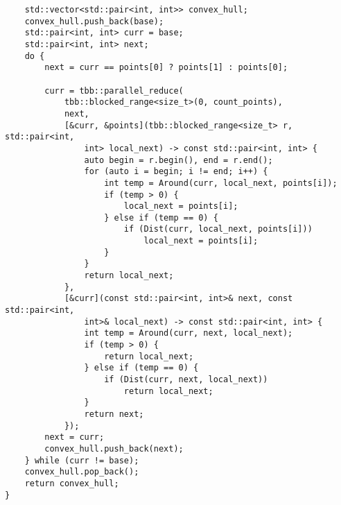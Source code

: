 \documentclass{report}
\begin{document}
\begin{lstlisting}
    std::vector<std::pair<int, int>> convex_hull;
    convex_hull.push_back(base);
    std::pair<int, int> curr = base;
    std::pair<int, int> next;
    do {
        next = curr == points[0] ? points[1] : points[0];

        curr = tbb::parallel_reduce(
            tbb::blocked_range<size_t>(0, count_points),
            next,
            [&curr, &points](tbb::blocked_range<size_t> r, std::pair<int,
                int> local_next) -> const std::pair<int, int> {
                auto begin = r.begin(), end = r.end();
                for (auto i = begin; i != end; i++) {
                    int temp = Around(curr, local_next, points[i]);
                    if (temp > 0) {
                        local_next = points[i];
                    } else if (temp == 0) {
                        if (Dist(curr, local_next, points[i]))
                            local_next = points[i];
                    }
                }
                return local_next;
            },
            [&curr](const std::pair<int, int>& next, const std::pair<int, 
                int>& local_next) -> const std::pair<int, int> {
                int temp = Around(curr, next, local_next);
                if (temp > 0) {
                    return local_next;
                } else if (temp == 0) {
                    if (Dist(curr, next, local_next))
                        return local_next;
                }
                return next;
            });
        next = curr;
        convex_hull.push_back(next);
    } while (curr != base);
    convex_hull.pop_back();
    return convex_hull;
}


\end{lstlisting}
\end{document}
